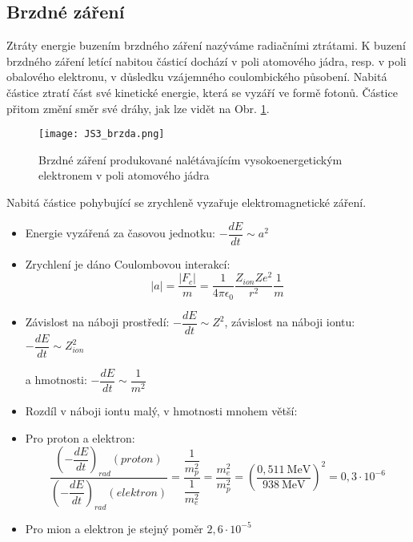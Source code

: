 \documentclass[../../main.tex]{subfiles}
\begin{document}
\subsection{Brzdné záření}

Ztráty energie buzením brzdného záření nazýváme radiačními ztrátami. K buzení brzdného záření letící nabitou částicí dochází v poli atomového jádra, resp. v poli obalového elektronu, v důsledku vzájemného coulombického působení. Nabitá částice ztratí část své kinetické energie, která se vyzáří ve formě fotonů. Částice přitom změní směr své dráhy, jak lze vidět na Obr. \ref{js3:obr:JS3_brzda}. 

\begin{figure}
	\centering
	\texttt{[image: JS3\_brzda.png]}
	\caption{Brzdné záření produkované nalétávajícím vysokoenergetickým elektronem v poli atomového jádra}	
	\label{js3:obr:JS3_brzda}	
\end{figure}

Nabitá částice pohybující se zrychleně vyzařuje elektromagnetické záření.

\begin{itemize}
	\item Energie vyzářená za časovou jednotku: $ - \dfrac{dE}{dt} \sim a^2$
	\item Zrychlení je dáno Coulombovou interakcí:
	\begin{equation}
	\left| a \right| = \dfrac{\left| F_c \right| }{m} = \dfrac{1}{4 \pi \epsilon_0} \dfrac{Z_{ion} Z e^2}{r^2} \dfrac{1}{m}
	\end{equation}
	\item Závislost na náboji prostředí: $- \dfrac{dE}{dt} \sim Z^2 $, závislost na náboji iontu: $- \dfrac{dE}{dt} \sim Z_{ion}^2$ 
	
	a hmotnosti: $- \dfrac{dE}{dt} \sim \dfrac{1}{m^2}$
	\item Rozdíl v náboji iontu malý, v hmotnosti mnohem větší:
	\item Pro proton a elektron:
	\begin{equation}
	\dfrac{\left( - \dfrac{dE}{dt}\right)_{rad} (proton)}{\left( - \dfrac{dE}{dt}\right)_{rad} (elektron)} = \dfrac{\dfrac{1}{m_{p}^2}}{\dfrac{1}{m_{e}^2}} = \dfrac{m_{e}^2}{m_{p}^2} = \left(\dfrac{0,511 ~\mathrm{MeV}}{938 ~\mathrm{MeV}} \right) ^2 = 0,3\cdotp 10^{-6}
	\end{equation}
	\item Pro mion a elektron je stejný poměr $2,6 \cdotp 10^{-5}$
\end{itemize}
\end{document}
